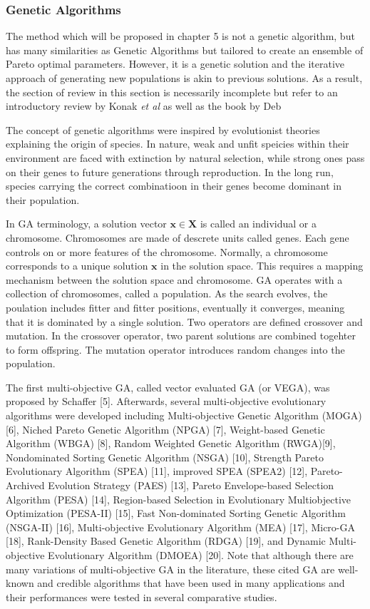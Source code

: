 \subsubsection{Genetic Algorithms}
The method which will be proposed in chapter 5 is not a genetic algorithm, but has many similarities as Genetic Algorithms but tailored to create an ensemble of Pareto optimal parameters.  However, it is a genetic solution and the iterative approach of generating new populations is akin to previous solutions.  As a result, the section of review in this section is necessarily incomplete but refer to an introductory review by Konak \emph{et al}\cite{Konak2006_moo_ga} as well as the book by Deb\cite{deb2001_moo_ga}

The concept of genetic algorithms were inspired by evolutionist theories explaining the origin of species\cite{holland1992_ga}.  In nature, weak and unfit speicies within their environment are faced with extinction by natural selection, while strong ones pass on their genes to future generations through reproduction.  In the long run, species carrying the correct combinatioon in their
    genes become dominant in their population.

In GA terminology, a solution vector $\bm{x}\in\bm{X}$ is called an individual or a chromosome.  Chromosomes are made of descrete units called genes.  Each gene controls on or more features of the chromosome.  Normally, a chromosome corresponds to a unique solution $\bm{x}$ in the solution space.  This requires a mapping mechanism between the solution space and chromosome.  GA operates with a collection of chromosomes, called a population.  As the search evolves, the poulation includes fitter and fitter positions, eventually it converges, meaning that it is dominated by a single solution.  Two operators are defined crossover and mutation.  In the crossover operator, two parent solutions are combined togehter to form offspring.  The mutation operator introduces random changes into the population.

The first multi-objective GA, called vector evaluated GA (or VEGA), was proposed by Schaffer [5]. Afterwards, several multi-objective evolutionary algorithms were developed including Multi-objective Genetic Algorithm (MOGA) [6], Niched Pareto Genetic Algorithm (NPGA) [7], Weight-based Genetic Algorithm (WBGA) [8], Random Weighted Genetic Algorithm (RWGA)[9], Nondominated Sorting Genetic Algorithm (NSGA) [10], Strength Pareto Evolutionary Algorithm (SPEA) [11], improved SPEA (SPEA2) [12], Pareto-Archived Evolution Strategy (PAES) [13], Pareto Envelope-based Selection Algorithm (PESA) [14], Region-based Selection in Evolutionary Multiobjective Optimization (PESA-II) [15], Fast Non-dominated Sorting Genetic Algorithm (NSGA-II) [16], Multi-objective Evolutionary Algorithm (MEA) [17], Micro-GA [18], Rank-Density Based Genetic Algorithm (RDGA) [19], and Dynamic Multi-objective Evolutionary Algorithm (DMOEA) [20]. Note that although there are many variations of multi-objective GA in the literature, these cited GA are well-known and credible algorithms that have been used in many applications and their performances were tested in several comparative studies.



